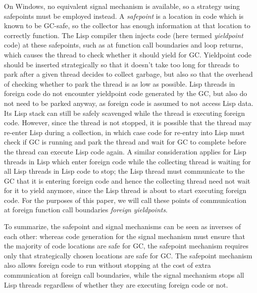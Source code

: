 \documentclass[format=sigconf]{acmart}
\begin{document}
On Windows, no equivalent signal mechanism is available, so a strategy using safepoints must be employed instead. A \textit{safepoint} is a location in code which is known to be GC-safe, so the collector has enough information at that location to correctly function. The Lisp compiler then injects code (here termed \textit{yieldpoint} code) at these safepoints, such as at function call boundaries and loop returns, which causes the thread to check whether it should yield for GC. Yieldpoint code should be inserted strategically so that it doesn't take too long for threads to park after a given thread decides to collect garbage, but also so that the overhead of checking whether to park the thread is as low as possible. Lisp threads in foreign code do not encounter yieldpoint code generated by the GC, but also do not need to be parked anyway, as foreign code is assumed to not access Lisp data. Its Lisp stack can still be safely scavenged while the thread is executing foreign code. However, since the thread is not stopped, it is possible that the thread may re-enter Lisp during a collection, in which case code for re-entry into Lisp must check if GC is running and park the thread and wait for GC to complete before the thread can execute Lisp code again. A similar consideration applies for Lisp threads in Lisp which enter foreign code while the collecting thread is waiting for all Lisp threads in Lisp code to stop; the Lisp thread must communicate to the GC that it is entering foreign code and hence the collecting thread need not wait for it to yield anymore, since the Lisp thread is about to start executing foreign code. For the purposes of this paper, we will call these points of communication at foreign function call boundaries \textit{foreign yieldpoints}.

To summarize, the safepoint and signal mechanisms can be seen as inverses of each other: whereas code generation for the signal mechanism must ensure that the majority of code locations are safe for GC, the safepoint mechanism requires only that strategically chosen locations are safe for GC. The safepoint mechanism also allows foreign code to run without stopping at the cost of extra communication at foreign call boundaries, while the signal mechanism stops all Lisp threads regardless of whether they are executing foreign code or not.
\end{document}
